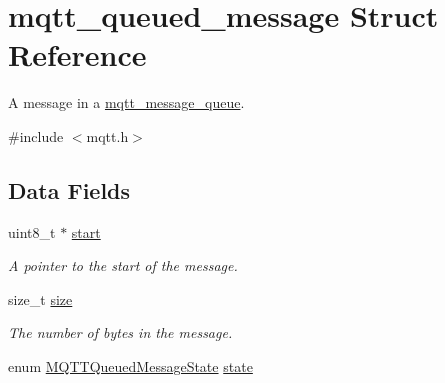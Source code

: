 \hypertarget{structmqtt__queued__message}{}\section{mqtt\+\_\+queued\+\_\+message Struct Reference}
\label{structmqtt__queued__message}


A message in a \hyperlink{structmqtt__message__queue}{mqtt\+\_\+message\+\_\+queue}.  




{\ttfamily \#include $<$mqtt.\+h$>$}

\subsection*{Data Fields}
\begin{DoxyCompactItemize}
\item 
uint8\+\_\+t $\ast$ \hyperlink{structmqtt__queued__message_a88eb1a4864d7bbf52b9324d96926515d}{start}\hypertarget{structmqtt__queued__message_a88eb1a4864d7bbf52b9324d96926515d}{}\label{structmqtt__queued__message_a88eb1a4864d7bbf52b9324d96926515d}

\begin{DoxyCompactList}\small\item\em A pointer to the start of the message. \end{DoxyCompactList}\item 
size\+\_\+t \hyperlink{structmqtt__queued__message_a43288f54585b71fa57a6bb736afd23ab}{size}\hypertarget{structmqtt__queued__message_a43288f54585b71fa57a6bb736afd23ab}{}\label{structmqtt__queued__message_a43288f54585b71fa57a6bb736afd23ab}

\begin{DoxyCompactList}\small\item\em The number of bytes in the message. \end{DoxyCompactList}\item 
enum \hyperlink{group__details_ga28b018ca5d1c81101d36f9c0d532a0d0}{M\+Q\+T\+T\+Queued\+Message\+State} \hyperlink{structmqtt__queued__message_a0f3644cfd65c483d271bb97e82c94fd3}{state}\hypertarget{structmqtt__queued__message_a0f3644cfd65c483d271bb97e82c94fd3}{}\label{structmqtt__queued__message_a0f3644cfd65c483d271bb97e82c94fd3}


\end{DoxyCompactItemize}
